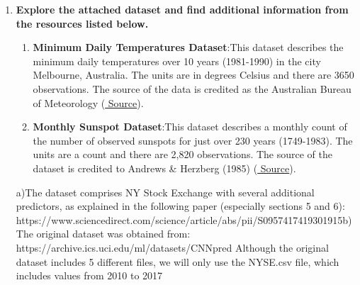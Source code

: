 \documentclass[12pt]{article}
\begin{document}



\pagebreak

\begin{enumerate}

\item \textbf{Explore the attached dataset and find additional information from the resources listed below.}
\begin{enumerate}
\item \textbf{Minimum Daily Temperatures Dataset}:This dataset describes the minimum daily temperatures over 10 years (1981-1990) in the city Melbourne, Australia. The units are in degrees Celsius and there are 3650 observations. The source of the data is credited as the Australian Bureau of Meteorology  (\href{https://raw.githubusercontent.com/jbrownlee/Datasets/master/daily-min-temperatures.csv}{ Source}).
\item \textbf{Monthly Sunspot Dataset}:This dataset describes a monthly count of the number of observed sunspots for just over 230 years (1749-1983). The units are a count and there are 2,820 observations. The source of the dataset is credited to Andrews \& Herzberg (1985) (\href{https://raw.githubusercontent.com/jbrownlee/Datasets/master/monthly-sunspots.csv}{ Source}).
\end{enumerate}


a)The dataset comprises NY Stock Exchange with several additional predictors, as explained in the following paper 
(especially sections 5 and 6): https://www.sciencedirect.com/science/article/abs/pii/S0957417419301915b)
The original dataset was obtained from: 
https://archive.ics.uci.edu/ml/datasets/CNNpred%
Although the original dataset includes 5 different files, we will only use the NYSE.csv file, which includes values from 2010 to 2017

\newpage

\newpage

\newpage

\newpage











\end{enumerate}
\end{document}
